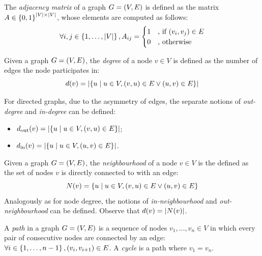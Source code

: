 \begin{definition}
The \emph{adjacency matrix} of a graph $G=\mathopen{}\left(V, E\right)$ is defined as the matrix $A \in \mathopen{}\left\{0,1\right\}^{\mathopen{}\left|V\right| \times \mathopen{}\left|V\right|}$, whose elements are computed as follows:
\begin{equation}
\forall i,j \in \mathopen{}\left\{1, \dots, \mathopen{}\left|V\right|\right\}, A_{ij} = \begin{cases}1 &\text{, if }\mathopen{}\left(v_i, v_j\right) \in E \\ 0 & \text{, otherwise} \end{cases}
\end{equation}
\end{definition}

\begin{definition}
Given a graph $G=\mathopen{}\left(V, E\right)$, the \emph{degree} of a node $v \in V$ is defined as the number of edges the node participates in: 
\begin{equation}
d\mathopen{}\left(v\right) = \mathopen{}\left|\mathopen{}\left\{u \mid u \in V, \mathopen{}\left(v, u\right) \in E \vee \mathopen{}\left(u, v\right) \in E \right\}\right|
\end{equation}

For directed graphs, due to the asymmetry of edges, the separate notions of \emph{out-degree} and \emph{in-degree} can be defined:
\begin{itemize}
\item $d_{\text{out}}\mathopen{}\left(v\right) = \mathopen{}\left|\mathopen{}\left\{u \mid u \in V, \mathopen{}\left(v, u\right) \in E \right\}\right|$;
\item $d_{\text{in}}\mathopen{}\left(v\right) = \mathopen{}\left|\mathopen{}\left\{u \mid u \in V, \mathopen{}\left(u, v\right) \in E \right\}\right|$.
\end{itemize}
\end{definition}

\begin{definition}
Given a graph $G=\mathopen{}\left(V, E\right)$, the \emph{neighbourhood} of a node $v \in V$ is the defined as the set of nodes $v$ is directly connected to with an edge: \begin{equation}
N\mathopen{}\left(v\right)=\mathopen{}\left\{u \mid u\in V, \mathopen{}\left(v,u\right) \in E \vee \mathopen{}\left(u,v\right) \in E \right\}
\end{equation} 
Analogously as for node degree, the notions of \emph{in-neighbourhood} and \emph{out-neighbourhood} can be defined. Observe that $d\mathopen{}\left(v\right)=\mathopen{}\left|N\mathopen{}\left(v\right)\right|$.
\end{definition}

\begin{definition}
A \emph{path} in a graph $G=\mathopen{}\left(V, E\right)$ is a sequence of nodes $v_1,\dots,v_n \in V$ in which every pair of consecutive nodes are connected by an edge:\\ $\forall i \in \mathopen{}\left\{1,\dots,n-1\right\},\mathopen{}\left(v_i,v_{i+1}\right)\in E$. A \emph{cycle} is a path where $v_1=v_n$.
\end{definition}

